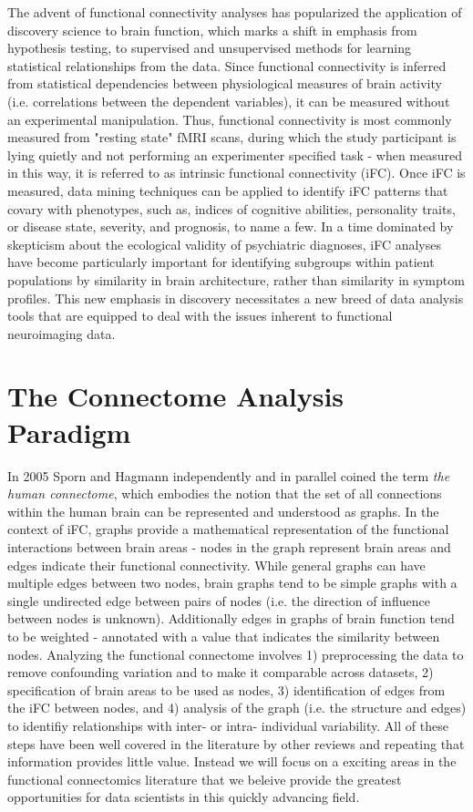 The advent of functional connectivity analyses has popularized the application
of discovery science to brain function, which marks a shift in emphasis from
hypothesis testing, to supervised and unsupervised methods for learning
statistical relationships from the data. Since functional connectivity is
inferred from statistical dependencies between physiological measures of brain
activity (i.e. correlations between the dependent variables), it can be
measured without an experimental manipulation. Thus, functional connectivity is
most commonly measured from "resting state" fMRI scans, during which the study
participant is lying quietly and not performing an experimenter specified task
- when measured in this way, it is referred to as intrinsic functional
connectivity (iFC). Once iFC is measured, data mining techniques can be applied
to identify iFC patterns that covary with phenotypes, such as, indices of
cognitive abilities, personality traits, or disease state, severity, and
prognosis, to name a few. In a time dominated by skepticism about the
ecological validity of psychiatric diagnoses, iFC analyses have become
particularly important for identifying subgroups within patient populations by
similarity in brain architecture, rather than similarity in symptom profiles.
This new emphasis in discovery necessitates a new breed of data analysis tools
that are equipped to deal with the issues inherent to functional neuroimaging
data.

\section{The Connectome Analysis Paradigm}

In 2005 Sporn and Hagmann \cite{Sporns2005,Hagmann2005} independently and in
parallel coined the term \textit{the human connectome}, which embodies the
notion that the set of all connections within the human brain can be
represented and understood as graphs. In the context of iFC, graphs provide a
mathematical representation of the functional interactions between brain areas -
 nodes in the graph represent brain areas and edges indicate their functional connectivity.
While general graphs can have multiple edges between two nodes, brain
graphs tend to be simple graphs with a single undirected edge between pairs of
nodes (i.e. the direction of influence between nodes is unknown). Additionally
edges in graphs of brain function tend to be weighted - annotated with a value
that indicates the similarity between nodes. Analyzing the functional connectome 
involves 1) preprocessing the data to remove confounding variation and to make
it comparable across datasets, 2) specification of brain areas to be used as nodes,
3) identification of edges from the iFC between nodes, and 4) analysis of the graph
(i.e. the structure and edges) to identifiy relationships with inter- or intra- individual
variability. All of these steps have been well covered in the literature  by other
reviews and repeating that information provides little value. Instead we will focus on a 
exciting areas in the functional connectomics literature that we beleive provide the greatest
opportunities for data scientists in this quickly advancing field.

